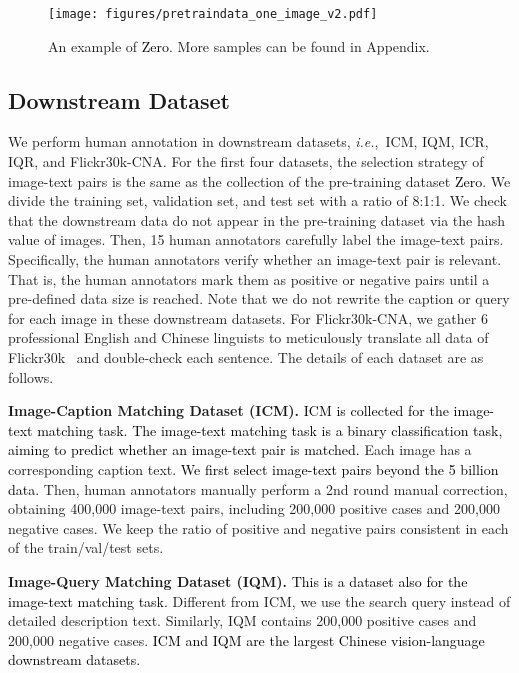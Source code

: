 \documentclass[sigconf]{acmart}
\def\ie{\mbox{\textit{i.e.}, }}
\def\ljc{\textcolor{black}}
\def\mmxie{\textcolor{black}}
\def\mmljc{\textcolor{black}}
\def\mmcr{\textcolor{black}}
\begin{document}
\begin{figure*}[htb]
    \centering
	\texttt{[image: figures/pretraindata\_one\_image\_v2.pdf]}
	\caption{{An example of \mmcr{Zero}. More samples can be found in Appendix.}
	}
	\label{fig:pretraindata_one_image}
\end{figure*}

\subsection{Downstream Dataset}
\label{downstream_dataset_intro}
We perform human annotation in downstream datasets, \ie ICM, IQM, ICR, IQR, and Flickr30k-CNA. For the first four datasets, the selection strategy of image-text pairs is the same as the collection of the pre-training dataset \mmcr{Zero}. We divide the training set, validation set, and test set with a ratio of 8:1:1. We check that the downstream data do not appear in the pre-training dataset via the hash value of images. Then, 15 human annotators carefully label the image-text pairs. Specifically, the human annotators verify whether an image-text pair is relevant. That is, the human annotators mark them as positive or negative pairs until a pre-defined data size is reached. Note that we do not rewrite the caption or query for each image in these downstream datasets. For Flickr30k-CNA, we gather 6 professional English and Chinese linguists to meticulously translate all data of Flickr30k~\cite{Flickr} and double-check each sentence. The details of each dataset are as follows.





\textbf{Image-Caption Matching Dataset (ICM).}
\ljc{ICM is collected for the image-text matching task.}
\mmxie{The image-text matching task is a binary classification task, aiming to predict whether an image-text pair is matched.}
{Each image has a corresponding caption text.}
\mmljc{We first select image-text pairs beyond the 5 billion data.}
Then, human annotators manually perform a 2nd round manual correction, 
obtaining 400,000 image-text pairs, including 200,000 positive cases and 200,000 negative cases.
We keep the ratio of positive and negative pairs consistent in each of the train/val/test sets.


\textbf{Image-Query Matching Dataset (IQM).} \ljc{This is a dataset also for the image-text matching task.}
Different from ICM, we use the search query instead of detailed description text. 
Similarly, IQM contains 200,000 positive cases and 200,000 negative cases.
\mmljc{ICM and IQM are the largest Chinese vision-language downstream datasets.}
\end{document}
